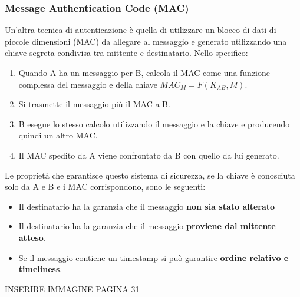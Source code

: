 \documentclass[12pt]{article}
\begin{document}
	\subsubsection{Message Authentication Code (MAC)}
		Un'altra tecnica di autenticazione è quella di utilizzare un blocco di dati di piccole dimensioni (MAC) da allegare al messaggio e generato utilizzando una chiave segreta condivisa tra mittente e destinatario. Nello specifico:
		\begin{enumerate}
			\item Quando A ha un messaggio per B, calcola il MAC come una funzione complessa del messaggio e della chiave $MAC_{M} = F(K_{AB},M)$.
			\item Si trasmette il messaggio più il MAC a B.
			\item B esegue lo stesso calcolo utilizzando il messaggio e la chiave e producendo quindi un altro MAC.
			\item Il MAC spedito da A viene confrontato da B con quello da lui generato. 
		\end{enumerate}
		Le proprietà che garantisce questo sistema di sicurezza, se la chiave è conosciuta solo da A e B e i MAC corrispondono, sono le seguenti:
		\begin{itemize}
			\item Il destinatario ha la garanzia che il messaggio \textbf{non sia stato alterato}
			\item Il destinatario ha la garanzia che il messaggio \textbf{proviene dal mittente atteso}.
			\item Se il messaggio contiene un timestamp si può garantire \textbf{ordine relativo e timeliness}.
		\end{itemize}
	
		INSERIRE IMMAGINE PAGINA 31\\
		
		
		
		
		
		
		
			
			
	
	
				
				
				
			
				
				
				
					
				
				
				
			 
			 
			 	
		
		
		  




	
\end{document}
